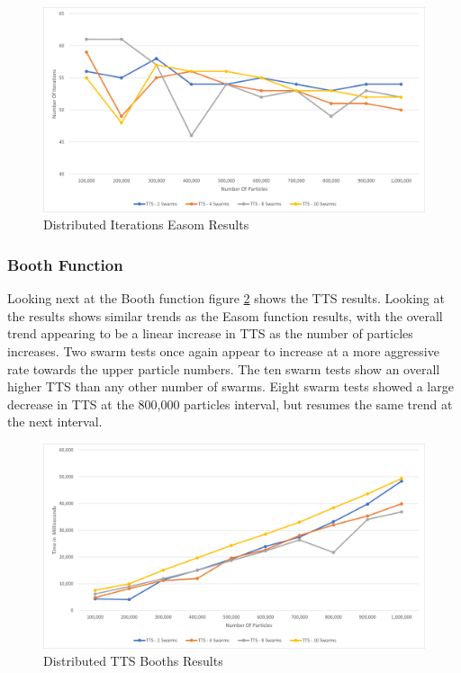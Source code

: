 \documentclass[oneside,12pt]{book}
\begin{document}
\begin{figure}[H]
    \centering
    \includegraphics[scale=0.45]{Images/Graphs/DistributedEasomEpoch.png}
    \caption{Distributed Iterations Easom Results}
    \label{fig:Distributed_Epoc_Easom_Results}
\end{figure}

\subsubsection{Booth Function}
Looking next at the Booth function figure \ref{fig:Distributed_TTS_Booths_Results} shows the TTS results. Looking at the results shows similar trends as the Easom function results, with the overall trend appearing to be a linear increase in TTS as the number of particles increases. Two swarm tests once again appear to increase at a more aggressive rate towards the upper particle numbers. The ten swarm tests show an overall higher TTS than any other number of swarms. Eight swarm tests showed a large decrease in TTS at the 800,000 particles interval, but resumes the same trend at the next interval. 

\begin{figure}[H]
    \centering
    \includegraphics[scale=0.45]{Images/Graphs/DistributedBoothsTTS.png}
    \caption{Distributed TTS Booths Results}
    \label{fig:Distributed_TTS_Booths_Results}
\end{figure}
\end{document}

